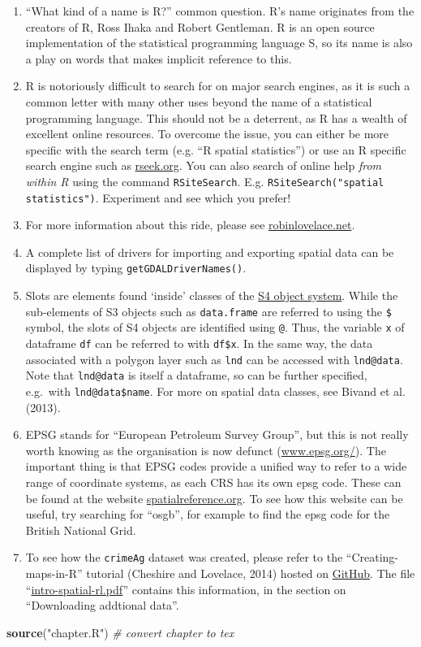 \documentclass[]{article}
\newenvironment{Shaded}{}{}
\newcommand{\KeywordTok}[1]{\textcolor[rgb]{0.00,0.44,0.13}{\textbf{{#1}}}}
\newcommand{\StringTok}[1]{\textcolor[rgb]{0.25,0.44,0.63}{{#1}}}
\newcommand{\CommentTok}[1]{\textcolor[rgb]{0.38,0.63,0.69}{\textit{{#1}}}}
\newcommand{\NormalTok}[1]{{#1}}
\begin{document}
\begin{enumerate}[1.]
\item
  ``What kind of a name is R?'' common question. R's name originates
  from the creators of R, Ross Ihaka and Robert Gentleman. R is an open
  source implementation of the statistical programming language S, so
  its name is also a play on words that makes implicit reference to
  this.
\item
  R is notoriously difficult to search for on major search engines, as
  it is such a common letter with many other uses beyond the name of a
  statistical programming language. This should not be a deterrent, as R
  has a wealth of excellent online resources. To overcome the issue, you
  can either be more specific with the search term (e.g. ``R spatial
  statistics'') or use an R specific search engine such as
  \href{http://www.rseek.org/}{rseek.org}. You can also search of online
  help \emph{from within R} using the command \texttt{RSiteSearch}. E.g.
  \texttt{RSiteSearch("spatial statistics")}. Experiment and see which
  you prefer!
\item
  For more information about this ride, please see
  \href{http://robinlovelace.net/ecotech/2013/10/13/bicycle-trailer-move.html}{robinlovelace.net}.
\item
  A complete list of drivers for importing and exporting spatial data
  can be displayed by typing \texttt{getGDALDriverNames()}.
\item
  Slots are elements found `inside' classes of the
  \href{http://adv-r.had.co.nz/S4.html}{S4 object system}. While the
  sub-elements of S3 objects such as \texttt{data.frame} are referred to
  using the \texttt{\$} symbol, the slots of S4 objects are identified
  using \texttt{@}. Thus, the variable \texttt{x} of dataframe
  \texttt{df} can be referred to with \texttt{df\$x}. In the same way,
  the data associated with a polygon layer such as \texttt{lnd} can be
  accessed with \texttt{lnd@data}. Note that \texttt{lnd@data} is itself
  a dataframe, so can be further specified, e.g.~with
  \texttt{lnd@data\$name}. For more on spatial data classes, see Bivand
  et al. (2013).
\item
  EPSG stands for ``European Petroleum Survey Group'', but this is not
  really worth knowing as the organisation is now defunct
  (\href{http://www.epsg.org/}{www.epsg.org/}). The important thing is
  that EPSG codes provide a unified way to refer to a wide range of
  coordinate systems, as each CRS has its own epsg code. These can be
  found at the website
  \href{http://spatialreference.org/}{spatialreference.org}. To see how
  this website can be useful, try searching for ``osgb'', for example to
  find the epsg code for the British National Grid.
\item
  To see how the \texttt{crimeAg} dataset was created, please refer to
  the ``Creating-maps-in-R'' tutorial (Cheshire and Lovelace, 2014)
  hosted on
  \href{https://github.com/Robinlovelace/Creating-maps-in-R}{GitHub}.
  The file
  ``\href{https://github.com/Robinlovelace/Creating-maps-in-R/blob/master/intro-spatial-rl.pdf}{intro-spatial-rl.pdf}''
  contains this information, in the section on ``Downloading addtional
  data''.
\end{enumerate}
\begin{Shaded}
\begin{Highlighting}[]
\KeywordTok{source}\NormalTok{(}\StringTok{"chapter.R"}\NormalTok{)  }\CommentTok{# convert chapter to tex}
\end{Highlighting}
\end{Shaded}
\end{document}
